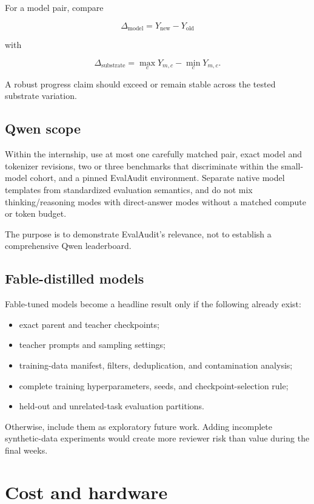 \documentclass[11pt]{article}
\begin{document}
For a model pair, compare

\[
\Delta_{\mathrm{model}} = Y_{\mathrm{new}} - Y_{\mathrm{old}}
\]

with

\[
\Delta_{\mathrm{substrate}} = \max_c Y_{m,c} - \min_c Y_{m,c}.
\]

A robust progress claim should exceed or remain stable across the tested substrate variation.

\subsection{Qwen scope}

Within the internship, use at most one carefully matched pair, exact model and tokenizer revisions, two or three benchmarks that discriminate within the small-model cohort, and a pinned EvalAudit environment. Separate native model templates from standardized evaluation semantics, and do not mix thinking/reasoning modes with direct-answer modes without a matched compute or token budget.

The purpose is to demonstrate EvalAudit's relevance, not to establish a comprehensive Qwen leaderboard.

\subsection{Fable-distilled models}

Fable-tuned models become a headline result only if the following already exist:

\begin{itemize}
  \item exact parent and teacher checkpoints;
  \item teacher prompts and sampling settings;
  \item training-data manifest, filters, deduplication, and contamination analysis;
  \item complete training hyperparameters, seeds, and checkpoint-selection rule;
  \item held-out and unrelated-task evaluation partitions.
\end{itemize}

Otherwise, include them as exploratory future work. Adding incomplete synthetic-data experiments would create more reviewer risk than value during the final weeks.

\section{Cost and hardware}
\end{document}
